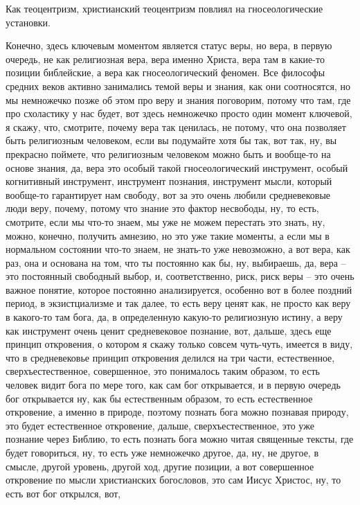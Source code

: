 Как теоцентризм,
христианский теоцентризм повлиял на гносеологические установки. 

Конечно, здесь
ключевым моментом является статус веры, но вера, в первую очередь, не как
религиозная вера, вера именно Христа, вера там в какие-то позиции библейские, а
вера как гносеологический феномен. Все философы средних веков активно занимались
темой веры и знания, как они соотносятся, но мы немножечко позже об этом про
веру и знания поговорим, потому что там, где про схоластику у нас будет, вот
здесь немножечко просто один момент ключевой, я скажу, что, смотрите, почему
вера так ценилась, не потому, что она позволяет быть религиозным человеком, если
вы подумайте хотя бы так, вот так, ну, вы прекрасно поймете, что религиозным
человеком можно быть и вообще-то на основе знания, да, вера это особый такой
гносеологический инструмент, особый когнитивный инструмент, инструмент познания,
инструмент мысли, который вообще-то гарантирует нам свободу, вот за это очень
любили средневековые люди веру, почему, потому что знание это фактор несвободы,
ну, то есть, смотрите, если мы что-то знаем, мы уже не можем перестать это
знать, ну, можно, конечно, получить амнезию, но это уже такие моменты, а если мы
в нормальном состоянии что-то знаем, не знать-то уже невозможно, а вот вера, как
раз, она и основана на том, что ты постоянно как бы, ну, выбираешь, да, вера –
это постоянный свободный выбор, и, соответственно, риск, риск веры – это очень
важное понятие, которое постоянно анализируется, особенно вот в более поздний
период, в экзистциализме и так далее, то есть веру ценят как, не просто как веру
в какого-то там бога, да, в определенную какую-то религиозную истину, а веру как
инструмент очень ценит средневековое познание, вот, дальше, здесь еще принцип
откровения, о котором я скажу только совсем чуть-чуть, имеется в виду, что в
средневековье принцип откровения делился на три части, естественное,
сверхъестественное, совершенное, это понималось таким образом, то есть человек
видит бога по мере того, как сам бог открывается, и в первую очередь бог
открывается ну, как бы естественным образом, то есть естественное откровение, а
именно в природе, поэтому познать бога можно познавая природу, это будет
естественное откровение, дальше, сверхъестественное, это уже познание через
Библию, то есть познать бога можно читая священные тексты, где будет говориться,
ну, то есть уже немножечко другое, да, ну, не другое, в смысле, другой уровень,
другой ход, другие позиции, а вот совершенное откровение по мысли христианских
богословов, это сам Иисус Христос, ну, то есть вот бог открылся, вот,

